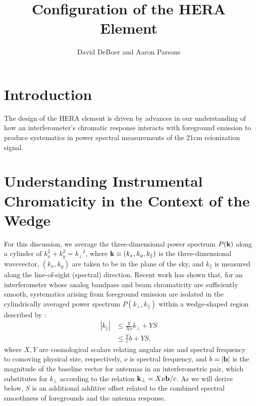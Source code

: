 \documentclass[11pt]{article}
\newcommand{\kvec}{{\bf k}}
\newcommand{\bvec}{{\bf b}}
\newcommand{\kpr}{{k_\perp}}
\newcommand{\kvpr}{{\kvec_\perp}}
\newcommand{\kpl}{{k_\parallel}}
\begin{document}
\title{Configuration of the HERA Element}
\author{David DeBoer and Aaron Parsons}
\maketitle

\section{Introduction}

The design of the HERA element is driven by advances in our understanding of how
an interferometer's chromatic response interacts with foreground emission to
produce systematics in power spectral measurements of the 21cm reionization signal.

\section{Understanding Instrumental Chromaticity in the Context of the Wedge}

For this discussion, we average the three-dimensional power spectrum $P(\kvec)$ along a cylinder
of $k_x^2+k_y^2=\kpr^2$, where $\kvec\equiv(k_x,k_y,\kpl)$ is the three-dimensional wavevector,
$(k_x,k_y)$ are taken to be in the plane of the sky, and $\kpl$ is measured along the line-of-sight (spectral)
direction.
Recent work has shown that, for an interferometer whose
analog bandpass and beam chromaticity are sufficiently smooth, systematics arising from foreground emission
are isolated in the cylindrically averaged power spectrum $P(\kpr,\kpl)$ within
a wedge-shaped region described by \citep{parsons_et_al2012b,pober_et_al2013,parsons_et_al2014,ali_et_al2015}:
\begin{align}
|\kpl| &\le \frac{Y}{X\nu}\kpr + YS\nonumber\\
&\le \frac{Y}{c}b + YS,
\label{eq:wedge_bound}
\end{align}
where $X,Y$ are cosmological scalars relating angular size and spectral frequency to comoving 
physical size, respectively, $\nu$ is spectral frequency, and $b=|\bvec|$ is the magnitude of the baseline vector for
antennas in an interferometric pair, which substitutes for $\kpr$ according to the
relation $\kvpr=X\nu\bvec/c$. As we will derive below, $S$ is an additional additive offset related to
the combined spectral smoothness of foregrounds and the antenna response.
\end{document}
